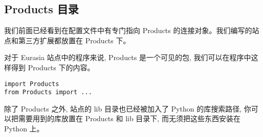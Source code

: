 \documentclass{manual}
\begin{document}
\subsection{Products 目录}

我们前面已经看到在配置文件中有专门指向 Products 的连接对象。我们编写的站点和第三方扩展都放置在 Products 下。

对于 Eurasia 站点中的程序来说, Products 是一个可见的包, 我们可以在程序中这样得到 Products 下的内容。

\begin{verbatim}
import Products
from Products import ...
\end{verbatim}

除了 Products 之外, 站点的 lib 目录也已经被加入了 Python 的库搜索路径, 你可以把需要用到的库放置在 Products 和 lib 目录下, 而无须把这些东西安装在 Python 上。
\end{document}
